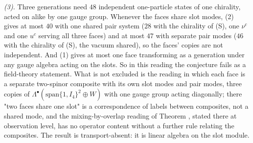 \emph{(3).} Three generations need $48$ independent one-particle states of one chirality, acted on alike by one gauge group. Whenever the faces share slot modes, (2) gives at most $40$ with one shared pair system ($28$ with the chirality of (S), one $\nu^{c}$ and one $u^{c}$ serving all three faces) and at most $47$ with separate pair modes ($46$ with the chirality of (S), the vacuum shared), so the faces' copies are not independent. And (1) gives at most one face transforming as a generation under any gauge algebra acting on the slots. So in this reading the conjecture  fails as a field-theory statement. What is not excluded is the reading in which each face is a separate two-spinor composite with its own slot modes and pair modes, three copies of $\Lambda^{\bullet}(\mathrm{span}\{1, I_4\}^{2} \oplus W)$ with one gauge group acting diagonally; there "two faces share one slot" is a correspondence of labels between composites, not a shared mode, and the mixing-by-overlap reading of Theorem , stated there at observation level, has no operator content without a further rule relating the composites. The result is transport-absent: it is linear algebra on the slot module.
